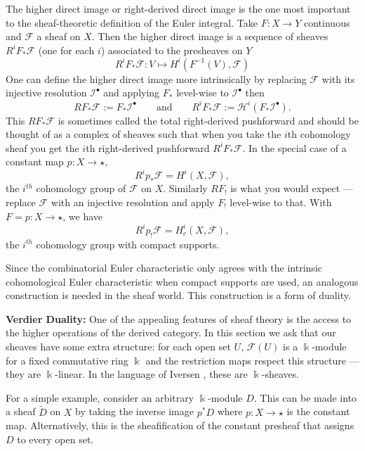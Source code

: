 \documentclass{psapm-l}
\theoremstyle{definition}
\theoremstyle{remark}
\numberwithin{equation}{section}
\begin{document}
The higher direct image or right-derived direct image is the one most important to the sheaf-theoretic definition of the Euler integral. Take $F\colon X\to Y$ continuous and ${{\mathcal F}}$ a sheaf on $X$. Then the higher direct image is a sequence of sheaves $R^iF_*{{\mathcal F}}$ (one for each $i$) associated to the presheaves on $Y$
\[
	R^iF_*{{\mathcal F}}: V\mapsto H^i(F^{-1}(V),{{\mathcal F}})
\]
One can define the higher direct image more intrinsically by replacing ${{\mathcal F}}$ with its injective resolution $\mathcal{I}^{\bullet}$ and applying $F_*$ level-wise to $\mathcal{I}^{\bullet}$ then
\[
	RF_*{{\mathcal F}}:=F_*\mathcal{I}^{\bullet} \qquad \mathrm{and} \qquad
	R^iF_*{{\mathcal F}}:=\mathcal{H}^i(F_*\mathcal{I}^{\bullet}).
\]
This $RF_*{{\mathcal F}}$ is sometimes called the total right-derived pushforward and should be thought of as a complex of sheaves such that when you take the $i$th cohomology sheaf you get the $i$th right-derived pushforward $R^iF_*{{\mathcal F}}$. In the special case of a constant map $p\colon X\to\star$,
\[
       R^ip_*{{\mathcal F}}=H^i(X,{{\mathcal F}}) ,
\]
the $i^{th}$ cohomology group of ${{\mathcal F}}$ on $X$. Similarly $RF_!$ is what you would expect --- replace ${{\mathcal F}}$ with an
injective resolution and apply $F_!$ level-wise to that. With $F=p\colon X\to\star$, we have
\[
       R^ip_!{{\mathcal F}}=H^i_c(X,{{\mathcal F}}) ,
\]
the $i^{th}$ cohomology group with compact supports.

Since the combinatorial Euler characteristic only agrees with the intrinsic cohomological Euler characteristic when compact supports are used, an analogous construction is needed in the sheaf world. This construction is a form of duality.

\vspace{0.1in}
\noindent
{\bf Verdier Duality:}
One of the appealing features of sheaf theory is the access to the higher operations of the derived category. In this section we ask that our sheaves have some extra structure: for each open set $U$, ${{\mathcal F}}(U)$ is a ${{\Bbbk}}$-module for a fixed commutative ring ${{\Bbbk}}$ and the restriction maps respect this structure --- they are ${{\Bbbk}}$-linear. In the language of Iversen \cite{Iversen}, these are ${{\Bbbk}}$-sheaves.

For a simple example, consider an arbitrary ${{\Bbbk}}$-module $D$. This can be made into a sheaf $\widetilde{D}$ on $X$ by taking the inverse image $p^*D$ where $p\colon X\to\star$ is the constant map. Alternatively, this is the sheafification of the constant presheaf that assigns $D$ to every open set.
\end{document}
